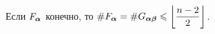 %
%
%
%
%
%

\begin{corollary}\label{onepoint} 
Если $F_{\bm{\alpha}}$ конечно, то  $\#F_{\bm{\alpha}}=\#G_{{\bm{\alpha}}{\bm{\beta}}}\leqslant\left\lfloor\dfrac{n-2}{2}\right\rfloor$.
\end{corollary}


